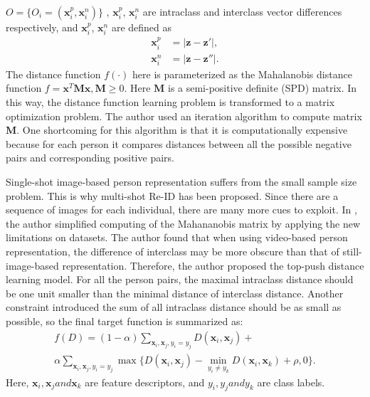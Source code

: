 $O=\{O_i=(\bm{x}_i^p, \bm{x}_i^n)\}$ , $\bm{x}_i^p$, $\bm{x}_i^n$ are intraclass and interclass vector differences respectively, and $\bm{x}_i^p$, $\bm{x}_i^n$ are defined as
\begin{equation}
\begin{aligned}
\bm{x}_i^p &= |\bm{z} - \bm{z}'|, \\
\bm{x}_i^n &= |\bm{z} - \bm{z}''|.
\end{aligned}
\end{equation}
The distance function $f(\cdot)$ here is parameterized as the Mahalanobis distance function
$f=\bm{x}^T\bm{M}\bm{x},\bm{M\ge}0$. Here $\bm{M}$ is a semi-positive definite (SPD) matrix. In this way, the distance function learning problem is transformed to a matrix optimization problem. The author used an iteration algorithm to compute matrix $\bm{M}$. One shortcoming for this algorithm is that it is computationally expensive because for each person it compares distances between all the possible negative pairs and corresponding positive pairs. 

Single-shot image-based person representation suffers from the small sample size problem. This is why multi-shot Re-ID has been proposed. Since there are a sequence of images for each individual, there are many more cues to exploit.
In \cite{TDL}, the author simplified computing of the Mahananobis matrix by applying the new limitations on datasets. The author found that when using video-based person representation, the difference of interclass may be more obscure than that of still-image-based representation. Therefore, the author proposed the top-push distance learning model. For all the person pairs, the maximal intraclass distance should be one unit smaller than the minimal distance of interclass distance. Another constraint introduced the sum of all intraclass distance should be as small as possible, so the final target function is summarized as:
\begin{equation}
\begin{aligned}
f(D) = (1-\alpha)\sum_{\bm{x}_i,\bm{x}_j,y_i=y_j} D(\bm{x}_i,\bm{x}_j) + \\
\alpha \sum_{\bm{x}_i,\bm{x}_j,y_i=y_j}\max\{{D(\bm{x}_i,\bm{x}_j)-\min_{y_i\ne y_k}{D(\bm{x}_i,\bm{x}_k)}+\rho,0}\}.
\end{aligned}
\end{equation}
Here, $\bm{x}_i, \bm{x}_j and \bm{x}_k$ are feature descriptors, and $y_i, y_j and y_k$ are class labels.

